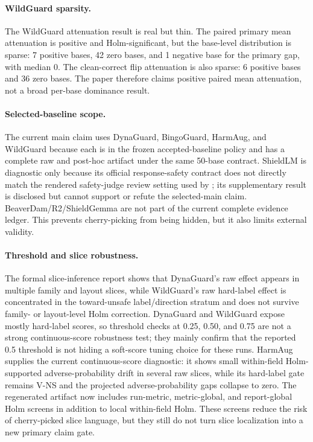 \paragraph{WildGuard sparsity.}
The WildGuard attenuation result is real but thin. The paired primary mean attenuation is positive and Holm-significant, but the base-level distribution is sparse: 7 positive bases, 42 zero bases, and 1 negative base for the primary gap, with median 0. The clean-correct flip attenuation is also sparse: 6 positive bases and 36 zero bases. The paper therefore claims positive paired mean attenuation, not a broad per-base dominance result.

\paragraph{Selected-baseline scope.}
The current main claim uses DynaGuard, BingoGuard, HarmAug, and WildGuard because each is in the frozen accepted-baseline policy and has a complete raw and post-hoc artifact under the same 50-base contract. ShieldLM is diagnostic only because its official response-safety contract does not directly match the rendered safety-judge review setting used by \auditname; its supplementary result is disclosed but cannot support or refute the selected-main claim. BeaverDam/R2/ShieldGemma are not part of the current complete evidence ledger. This prevents cherry-picking from being hidden, but it also limits external validity.

\paragraph{Threshold and slice robustness.}
The formal slice-inference report shows that DynaGuard's raw effect appears in multiple family and layout slices, while WildGuard's raw hard-label effect is concentrated in the toward-unsafe label/direction stratum and does not survive family- or layout-level Holm correction. DynaGuard and WildGuard expose mostly hard-label scores, so threshold checks at 0.25, 0.50, and 0.75 are not a strong continuous-score robustness test; they mainly confirm that the reported 0.5 threshold is not hiding a soft-score tuning choice for these runs. HarmAug supplies the current continuous-score diagnostic: it shows small within-field Holm-supported adverse-probability drift in several raw slices, while its hard-label gate remains V-NS and the projected adverse-probability gaps collapse to zero. The regenerated artifact now includes run-metric, metric-global, and report-global Holm screens in addition to local within-field Holm. These screens reduce the risk of cherry-picked slice language, but they still do not turn slice localization into a new primary claim gate.

